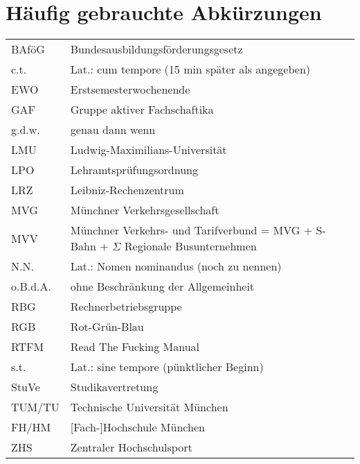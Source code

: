 ﻿
\section[Abkürzungen]{Häufig gebrauchte Abkürzungen}
\begin{tabular}{l p{10cm}}
BAföG        &Bundesausbildungsförderungsgesetz\\
c.t.        &Lat.: cum tempore (15 min später als angegeben)\\
EWO        &Erstsemesterwochenende\\
GAF        &Gruppe aktiver Fachschaftika\\
g.d.w.    & genau dann wenn\\
LMU        &Ludwig-Maximilians-Universität\\
LPO        &Lehramtsprüfungsordnung\\
LRZ        &Leibniz-Rechenzentrum\\
MVG    &Münchner Verkehrsgesellschaft\\
MVV    &Münchner Verkehrs- und Tarifverbund = \newline MVG + S-Bahn + $\Sigma$ Regionale Busunternehmen\\
N.N.        &Lat.: Nomen nominandus (noch zu nennen)\\
o.B.d.A.    &ohne Beschränkung der Allgemeinheit\\
RBG        &Rechnerbetriebsgruppe\\
RGB             &Rot-Grün-Blau\\
RTFM        &Read The Fucking Manual\\
s.t.        &Lat.: sine tempore (pünktlicher Beginn)\\
StuVe           &Studikavertretung\\
TUM/TU        &Technische Universität München\\
FH/HM        &[Fach-]Hochschule München\\
ZHS        &Zentraler Hochschulsport\\
\end{tabular}



